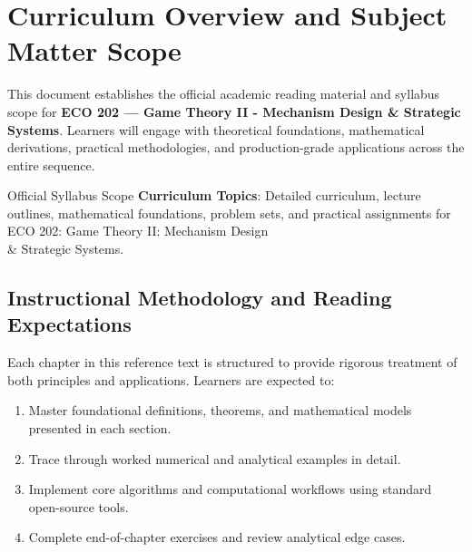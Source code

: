 \section{Curriculum Overview and Subject Matter Scope}

This document establishes the official academic reading material and syllabus scope for \textbf{ECO 202 --- Game Theory II - Mechanism Design \& Strategic Systems}. Learners will engage with theoretical foundations, mathematical derivations, practical methodologies, and production-grade applications across the entire sequence.

\begin{InsightBox}{Official Syllabus Scope}
  \textbf{Curriculum Topics}: Detailed curriculum, lecture outlines, mathematical foundations, problem sets, and practical assignments for ECO 202: Game Theory II: Mechanism Design \\& Strategic Systems.
\end{InsightBox}

\subsection{Instructional Methodology and Reading Expectations}

Each chapter in this reference text is structured to provide rigorous treatment of both principles and applications. Learners are expected to:
\begin{enumerate}
  \item Master foundational definitions, theorems, and mathematical models presented in each section.
  \item Trace through worked numerical and analytical examples in detail.
  \item Implement core algorithms and computational workflows using standard open-source tools.
  \item Complete end-of-chapter exercises and review analytical edge cases.
\end{enumerate}

